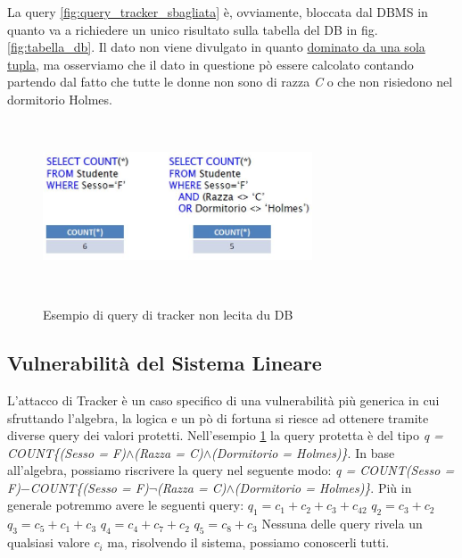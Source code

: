 La query \ref{fig:query_tracker_sbagliata} è, ovviamente, bloccata dal DBMS in quanto va a richiedere un unico risultato sulla tabella del DB in fig. \ref{fig:tabella_db}.
Il dato non viene divulgato in quanto \underline{dominato da una sola tupla}, ma osserviamo che il dato in questione pò essere calcolato contando partendo dal fatto che tutte le donne non sono di razza \textit{C} o che non risiedono nel dormitorio Holmes.

\begin{figure}[htpb]
\centering
	{\includegraphics[height=5cm, width=8cm, keepaspectratio]{Immagini/Capitolo10/prot_dati_14.jpg}}
		\caption{Esempio di query di tracker non lecita du DB
				  \label{fig:query_tracker}}  
\end{figure}

\subsection{Vulnerabilità del Sistema Lineare}
L'attacco di Tracker è un caso specifico di una vulnerabilità più generica in cui sfruttando l'algebra, la logica e un pò di fortuna si riesce ad ottenere tramite diverse query dei valori protetti.
\newpage
Nell'esempio \ref{fig:query_tracker} la query protetta è del tipo \textit{q = COUNT\{(Sesso = F)}$\wedge$\textit{(Razza = C)}$\wedge$\textit{(Dormitorio = Holmes)\}}.
\newline
In base all'algebra, possiamo riscrivere la query nel seguente modo: 
\textit{q = COUNT(Sesso = F)}$-$\textit{COUNT\{(Sesso = F)}$\neg$\textit{(Razza = C)}$\wedge$\textit{(Dormitorio = Holmes)\}}.
\newline
Più in generale potremmo avere le seguenti query:
\newline
$q_{1} = c_{1} + c_{2} + c_{3} + c_{42}$
\newline
$q_{2} = c_{3} + c_{2} $
\newline
$q_{3} = c_{5} + c_{1} + c_{3}$
\newline
$q_{4} = c_{4} + c_{7} + c_{2}$
\newline
$q_{5} = c_{8} + c_{3}$
Nessuna delle query rivela un qualsiasi valore $c_{i}$ ma, risolvendo il sistema, possiamo conoscerli tutti.

